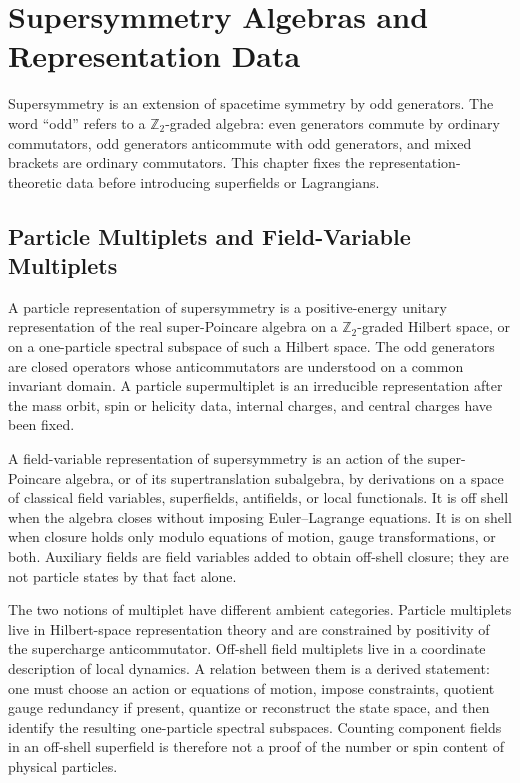 \chapter{Supersymmetry Algebras and Representation Data}
\label{ch:susy-algebras-representations}

\ConventionsLorentzian

Supersymmetry is an extension of spacetime symmetry by odd generators.  The
word ``odd'' refers to a \(\mathbb Z_2\)-graded algebra: even generators
commute by ordinary commutators, odd generators anticommute with odd
generators, and mixed brackets are ordinary commutators.  This chapter fixes
the representation-theoretic data before introducing superfields or
Lagrangians.

\section{Particle Multiplets and Field-Variable Multiplets}

\begin{definition}
\label{def:susy-particle-representation}
A particle representation of supersymmetry is a positive-energy unitary
representation of the real super-Poincare algebra on a \(\mathbb Z_2\)-graded
Hilbert space, or on a one-particle spectral subspace of such a Hilbert
space.  The odd generators are closed operators whose anticommutators are
understood on a common invariant domain.  A particle supermultiplet is an
irreducible representation after the mass orbit, spin or helicity data,
internal charges, and central charges have been fixed.
\end{definition}

\begin{definition}
\label{def:susy-field-variable-representation}
A field-variable representation of supersymmetry is an action of the
super-Poincare algebra, or of its supertranslation subalgebra, by derivations
on a space of classical field variables, superfields, antifields, or local
functionals.  It is off shell when the algebra closes without imposing
Euler--Lagrange equations.  It is on shell when closure holds only modulo
equations of motion, gauge transformations, or both.  Auxiliary fields are
field variables added to obtain off-shell closure; they are not particle
states by that fact alone.
\end{definition}

The two notions of multiplet have different ambient categories.  Particle
multiplets live in Hilbert-space representation theory and are constrained by
positivity of the supercharge anticommutator.  Off-shell field multiplets live
in a coordinate description of local dynamics.  A relation between them is a
derived statement: one must choose an action or equations of motion, impose
constraints, quotient gauge redundancy if present, quantize or reconstruct
the state space, and then identify the resulting one-particle spectral
subspaces.  Counting component fields in an off-shell superfield is therefore
not a proof of the number or spin content of physical particles.

